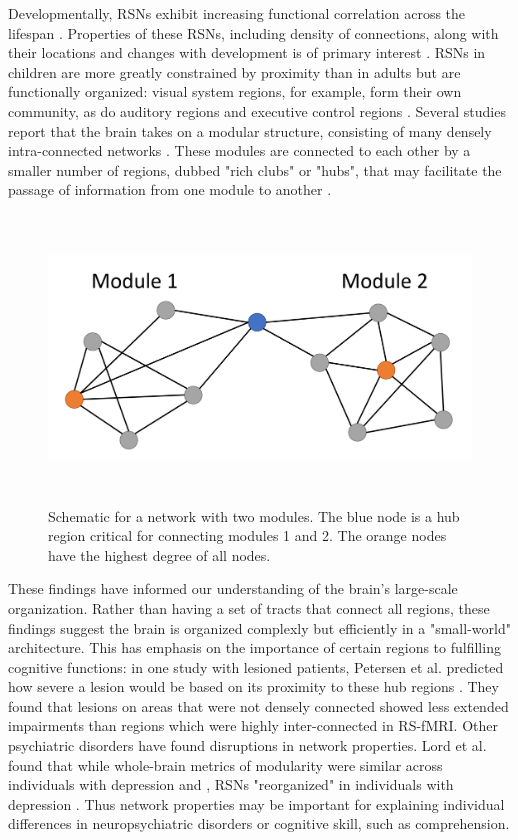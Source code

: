 Developmentally, RSNs exhibit increasing functional correlation across the lifespan \citep{Kesler2013, Uddin2010}. Properties of these RSNs, including density of connections, along with their locations and changes with development is of primary interest  \citep{Cole2014, Dosenbach2007, Fair2009}. RSNs in children are more greatly constrained by proximity than in adults but are functionally organized: visual system regions, for example, form their own community, as do auditory regions and executive control regions \citep{Seeley2007}. Several studies report that the brain takes on a modular structure, consisting of many densely intra-connected networks \citep{Bullmore2009, Fair2009, Supekar2009, Dosenbach2007}. These modules are connected to each other by a smaller number of regions, dubbed "rich clubs" or "hubs", that may facilitate the passage of information from one module to another \citep{Power2013, Bullmore2012}.

\begin{figure}[t]
    \centering
    \includegraphics[height=3in]{images/ch1-graph-schema.png}
    \caption[Schematic for a network with two modules.]{Schematic for a network with two modules. The blue node is a hub region critical for connecting modules 1 and 2. The orange nodes have the highest degree of all nodes.}
\end{figure}

These findings have informed our understanding of the brain's large-scale organization. Rather than having a set of tracts that connect all regions, these findings suggest the brain is organized complexly but efficiently in a "small-world" architecture. This has emphasis on the importance of certain regions to fulfilling cognitive functions: in one study with lesioned patients, Petersen et al. predicted how severe a lesion would be based on its proximity to these hub regions \citep{Warren2014}. They found that lesions on areas that were not densely connected showed less extended impairments than regions which were highly inter-connected in RS-fMRI. Other psychiatric disorders have found disruptions in network properties. Lord et al. found that while whole-brain metrics of modularity were similar across individuals with depression and , RSNs "reorganized" in individuals with depression \citep{Lord2012}. Thus network properties may be important for explaining individual differences in neuropsychiatric disorders or cognitive skill, such as comprehension. 

